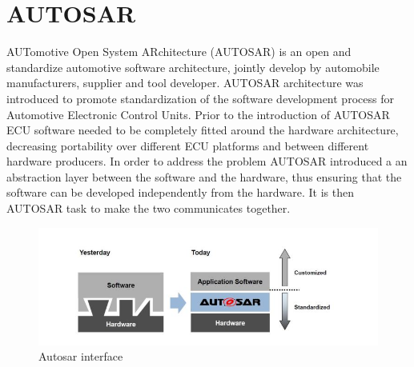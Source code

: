 \documentclass[../main.tex]{subfiles}
\begin{document}
\section{AUTOSAR}
AUTomotive Open System ARchitecture (\gls{AUTOSAR}) is an open and standardize automotive software architecture, jointly develop by automobile manufacturers, supplier and tool developer. \gls{AUTOSAR} architecture was introduced to promote standardization of the software development process for Automotive Electronic Control Units. Prior to the introduction of \gls{AUTOSAR} \gls{ECU} software needed to be completely fitted around the hardware architecture, decreasing portability over different \gls{ECU} platforms and between different hardware producers. 
In order to address the problem \gls{AUTOSAR} introduced a an abstraction layer between the software and the hardware, thus ensuring that the software can be developed independently from the hardware. It is then \gls{AUTOSAR} task to make the two communicates together.
\begin{figure}[h]
    \centering
    \includegraphics[width=\linewidth]{images_folder/autosarcapture.jpg}
    \caption{Autosar interface}
    \label{fig:AUTCA}
\end{figure}
\end{document}
